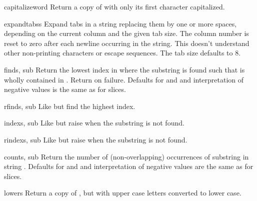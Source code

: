 \begin{funcdesc}{capitalize}{word}
  Return a copy of  with only its first character capitalized.
\end{funcdesc}

\begin{funcdesc}{expandtabs}{s}
  Expand tabs in a string replacing them by one or more spaces,
  depending on the current column and the given tab size.  The column
  number is reset to zero after each newline occurring in the string.
  This doesn't understand other non-printing characters or escape
  sequences.  The tab size defaults to 8.
\end{funcdesc}

\begin{funcdesc}{find}{s, sub}
  Return the lowest index in  where the substring  is
  found such that  is wholly contained in
  .  Return  on failure.
  Defaults for  and  and interpretation of
  negative values is the same as for slices.
\end{funcdesc}

\begin{funcdesc}{rfind}{s, sub}
  Like  but find the highest index.
\end{funcdesc}

\begin{funcdesc}{index}{s, sub}
  Like  but raise  when the
  substring is not found.
\end{funcdesc}

\begin{funcdesc}{rindex}{s, sub}
  Like  but raise  when the
  substring is not found.
\end{funcdesc}

\begin{funcdesc}{count}{s, sub}
  Return the number of (non-overlapping) occurrences of substring
   in string .
  Defaults for  and  and interpretation of
  negative values are the same as for slices.
\end{funcdesc}

\begin{funcdesc}{lower}{s}
  Return a copy of , but with upper case letters converted to
  lower case.
\end{funcdesc}

